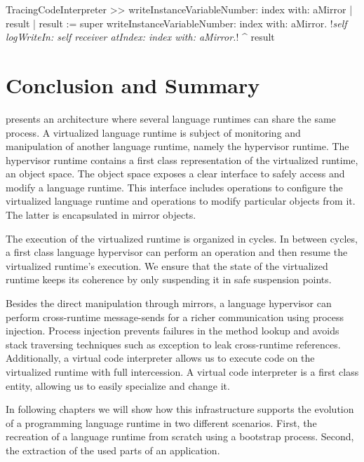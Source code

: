\begin{code}
TracingCodeInterpreter >> writeInstanceVariableNumber: index with: aMirror
    | result |
    result := super writeInstanceVariableNumber: index with: aMirror.
    !\emph{self logWriteIn: self receiver atIndex: index with: aMirror.}!
    ^ result
\end{code}

\section{Conclusion and Summary}

\Vtt presents an architecture where several language runtimes can share the same process. A virtualized language runtime is subject of monitoring and manipulation of another language runtime, namely the hypervisor runtime. The hypervisor runtime contains a first class representation of the virtualized runtime, an object space. The object space exposes a clear interface to safely access and modify a language runtime. This interface includes operations to configure the virtualized language runtime and operations to modify particular objects from it. The latter is encapsulated in mirror objects.

The execution of the virtualized runtime is organized in cycles. In between cycles, a first class language hypervisor can perform an operation and then resume the virtualized runtime's execution. We ensure that the state of the virtualized runtime keeps its coherence by only suspending it in safe suspension points.

Besides the direct manipulation through mirrors, a language hypervisor can perform cross-runtime message-sends for a richer communication using process injection. Process injection prevents failures in the method lookup and avoids stack traversing techniques such as exception to leak cross-runtime references. Additionally, a virtual code interpreter allows us to execute code on the virtualized runtime with full intercession. A virtual code interpreter is a first class entity, allowing us to easily specialize and change it.

In following chapters we will show how this infrastructure supports the evolution of a programming language runtime in two different scenarios. First, the recreation of a language runtime from scratch using a bootstrap process. Second, the extraction of the used parts of an application.

